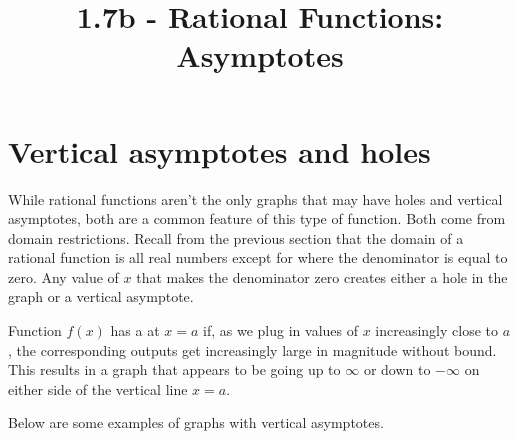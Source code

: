 \documentclass{ximera}
\title{1.7b - Rational Functions: Asymptotes}
\begin{document}
\begin{abstract} \end{abstract}
\maketitle



\section{Vertical asymptotes and holes}
While rational functions aren't the only graphs that may have holes and vertical asymptotes, both are a common feature of this type of function. Both come from domain restrictions. Recall from the previous section that the domain of a rational function is all real numbers except for where the denominator is equal to zero. Any value of $x$ that makes the denominator zero creates either a hole in the graph or a vertical asymptote.

\begin{definition}
  Function $f(x)$ has a  at $x=a$ if, as we plug in values of $x$ increasingly close to $a$, the corresponding outputs get increasingly large in magnitude without bound. This results in a graph that appears to be going up to $\infty$ or down to $-\infty$ on either side of the vertical line $x=a$.
\end{definition}

Below are some examples of graphs with vertical asymptotes. 

 \hfill
{}\hfill
{}
\vspace{-.1in}
\end{document}
